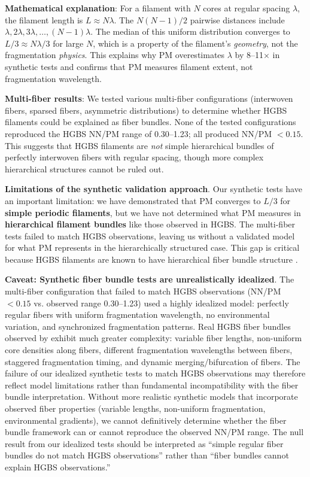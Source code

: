 \documentclass[twoside,twocolumn]{mnras}
\begin{document}
\textbf{Mathematical explanation}: For a filament with $N$ cores at regular spacing $\lambda$, the filament length is $L \approx N\lambda$. The $N(N-1)/2$ pairwise distances include $\lambda, 2\lambda, 3\lambda, \ldots, (N-1)\lambda$. The median of this uniform distribution converges to $L/3 \approx N\lambda/3$ for large $N$, which is a property of the filament's \textit{geometry}, not the fragmentation \textit{physics}. This explains why PM overestimates $\lambda$ by 8--11$\times$ in synthetic tests and confirms that PM measures filament extent, not fragmentation wavelength.

\textbf{Multi-fiber results}: We tested various multi-fiber configurations (interwoven fibers, sparsed fibers, asymmetric distributions) to determine whether HGBS filaments could be explained as fiber bundles. None of the tested configurations reproduced the HGBS NN/PM range of 0.30--1.23; all produced NN/PM $< 0.15$. This suggests that HGBS filaments are \textit{not} simple hierarchical bundles of perfectly interwoven fibers with regular spacing, though more complex hierarchical structures cannot be ruled out.

\textbf{Limitations of the synthetic validation approach}. Our synthetic tests have an important limitation: we have demonstrated that PM converges to $L/3$ for \textbf{simple periodic filaments}, but we have not determined what PM measures in \textbf{hierarchical filament bundles} like those observed in HGBS. The multi-fiber tests failed to match HGBS observations, leaving us without a validated model for what PM represents in the hierarchically structured case. This gap is critical because HGBS filaments are known to have hierarchical fiber bundle structure \citep{Hacar2013, Hacar2018, Yang2024}.

\textbf{Caveat: Synthetic fiber bundle tests are unrealistically idealized}. The multi-fiber configuration that failed to match HGBS observations (NN/PM $< 0.15$ vs. observed range 0.30--1.23) used a highly idealized model: perfectly regular fibers with uniform fragmentation wavelength, no environmental variation, and synchronized fragmentation patterns. Real HGBS fiber bundles observed by \citet{Hacar2013, Hacar2018, Yang2024} exhibit much greater complexity: variable fiber lengths, non-uniform core densities along fibers, different fragmentation wavelengths between fibers, staggered fragmentation timing, and dynamic merging/bifurcation of fibers. The failure of our idealized synthetic tests to match HGBS observations may therefore reflect model limitations rather than fundamental incompatibility with the fiber bundle interpretation. Without more realistic synthetic models that incorporate observed fiber properties (variable lengths, non-uniform fragmentation, environmental gradients), we cannot definitively determine whether the fiber bundle framework can or cannot reproduce the observed NN/PM range. The null result from our idealized tests should be interpreted as ``simple regular fiber bundles do not match HGBS observations'' rather than ``fiber bundles cannot explain HGBS observations.''
\end{document}
